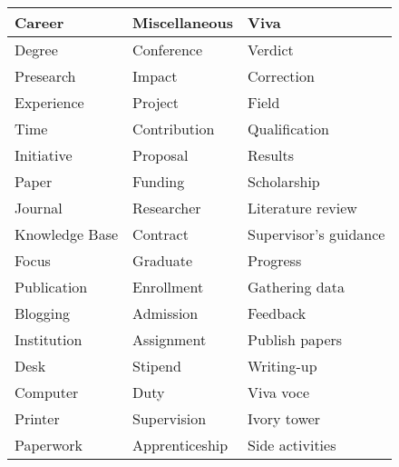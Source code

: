 \begin{table}[h]
\begin{tabular}{|l|l|l|}
Career            & Miscellaneous          & Viva                          \\ \hline
Degree            & Conference             & Verdict                       \\ \hline
Presearch         & Impact                 & Correction                    \\ \hline
Experience        & Project                & Field                         \\ \hline
Time              & Contribution           & Qualification                 \\ \hline
Initiative        & Proposal               & Results                       \\ \hline
Paper             & Funding                & Scholarship                   \\ \hline
Journal           & Researcher             & Literature review             \\ \hline
Knowledge Base    & Contract               & Supervisor's guidance         \\ \hline
Focus             & Graduate               & Progress                      \\ \hline
Publication       & Enrollment             & Gathering data                \\ \hline
Blogging          & Admission              & Feedback                      \\ \hline
Institution       & Assignment             & Publish papers                \\ \hline
Desk              & Stipend                & Writing-up                    \\ \hline
Computer          & Duty                   & Viva voce                     \\ \hline
Printer           & Supervision            & Ivory tower                   \\ \hline
Paperwork         & Apprenticeship         & Side activities               \\ \hline
\end{tabular}
\end{table}
